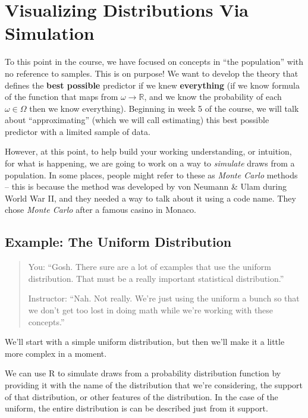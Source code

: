 \documentclass[
]{book}
\theoremstyle{definition}
\theoremstyle{definition}
\theoremstyle{definition}
\theoremstyle{definition}
\theoremstyle{remark}
\begin{document}
\hypertarget{visualizing-distributions-via-simulation}{%
\section{Visualizing Distributions Via Simulation}\label{visualizing-distributions-via-simulation}}

To this point in the course, we have focused on concepts in ``the population'' with no reference to samples. This is on purpose! We want to develop the theory that defines the \textbf{best possible} predictor if we knew \textbf{everything} (if we know formula of the function that maps from \(\omega \rightarrow \mathbb{R}\), and we know the probability of each \(\omega \in \Omega\) then we know everything). Beginning in week 5 of the course, we will talk about ``approximating'' (which we will call estimating) this best possible predictor with a limited sample of data.

However, at this point, to help build your working understanding, or intuition, for what is happening, we are going to work on a way to \emph{simulate} draws from a population. In some places, people might refer to these as \emph{Monte Carlo} methods -- this is because the method was developed by von Neumann \& Ulam during World War II, and they needed a way to talk about it using a code name. They chose \emph{Monte Carlo} after a famous casino in Monaco.

\hypertarget{example-the-uniform-distribution}{%
\subsection{Example: The Uniform Distribution}\label{example-the-uniform-distribution}}

\begin{quote}
You: ``Gosh. There sure are a lot of examples that use the uniform distribution. That must be a really important statistical distribution.''

Instructor: ``Nah. Not really. We're just using the uniform a bunch so that we don't get too lost in doing math while we're working with these concepts.''
\end{quote}

We'll start with a simple uniform distribution, but then we'll make it a little more complex in a moment.

We can use R to simulate draws from a probability distribution function by providing it with the name of the distribution that we're considering, the support of that distribution, or other features of the distribution. In the case of the uniform, the entire distribution is can be described just from it support.
\end{document}
